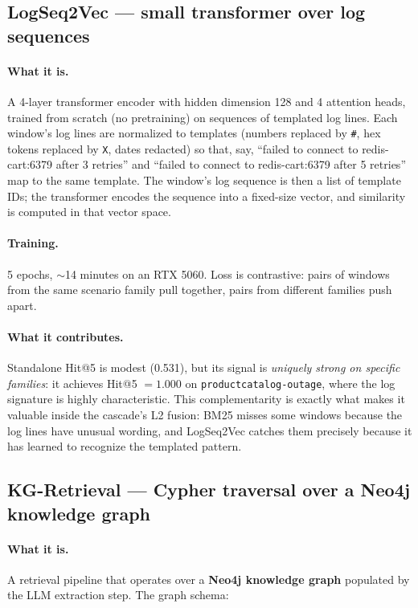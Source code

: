 \subsection{LogSeq2Vec --- small transformer over log sequences}

\paragraph{What it is.} A 4-layer transformer encoder with hidden dimension 128 and 4 attention heads, trained from scratch (no pretraining) on sequences of templated log lines. Each window's log lines are normalized to templates (numbers replaced by \texttt{\#}, hex tokens replaced by \texttt{X}, dates redacted) so that, say, ``failed to connect to redis-cart:6379 after 3 retries'' and ``failed to connect to redis-cart:6379 after 5 retries'' map to the same template. The window's log sequence is then a list of template IDs; the transformer encodes the sequence into a fixed-size vector, and similarity is computed in that vector space.

\paragraph{Training.} 5 epochs, $\sim$14 minutes on an RTX 5060. Loss is contrastive: pairs of windows from the same scenario family pull together, pairs from different families push apart.

\paragraph{What it contributes.} Standalone Hit@5 is modest (0.531), but its signal is \emph{uniquely strong on specific families}: it achieves Hit@5 $= 1.000$ on \texttt{productcatalog-outage}, where the log signature is highly characteristic. This complementarity is exactly what makes it valuable inside the cascade's L2 fusion: BM25 misses some windows because the log lines have unusual wording, and LogSeq2Vec catches them precisely because it has learned to recognize the templated pattern.

\subsection{KG-Retrieval --- Cypher traversal over a Neo4j knowledge graph}

\paragraph{What it is.} A retrieval pipeline that operates over a \textbf{Neo4j knowledge graph} populated by the LLM extraction step. The graph schema:

